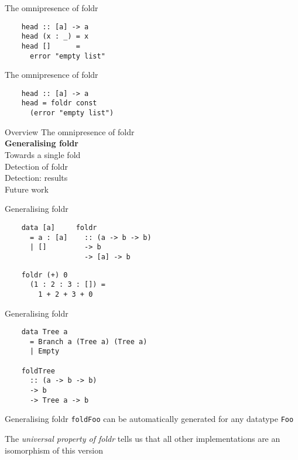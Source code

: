 \documentclass[20pt]{beamer}
\newcommand{\vspaced}{
    \vspace{5mm}
}
\begin{document}
\begin{frame}[fragile]{The omnipresence of foldr}
    \begin{lstlisting}
    head :: [a] -> a
    head (x : _) = x
    head []      =
      error "empty list"
    \end{lstlisting}
\end{frame}

\begin{frame}[fragile]{The omnipresence of foldr}
    \begin{lstlisting}
    head :: [a] -> a
    head = foldr const
      (error "empty list")
    \end{lstlisting}
\end{frame}


\begin{frame}{Overview}
    The omnipresence of foldr \\
    \textbf{Generalising foldr} \\
    Towards a single fold \\
    Detection of foldr \\
    Detection: results \\
    Future work \\
\end{frame}

\begin{frame}[fragile]{Generalising foldr}
    \begin{lstlisting}
    data [a]     foldr
      = a : [a]    :: (a -> b -> b)
      | []         -> b
                   -> [a] -> b
    \end{lstlisting}

    \begin{lstlisting}
    foldr (+) 0
      (1 : 2 : 3 : []) =
        1 + 2 + 3 + 0
    \end{lstlisting}
\end{frame}

\begin{frame}[fragile]{Generalising foldr}
    \begin{lstlisting}
    data Tree a
      = Branch a (Tree a) (Tree a)
      | Empty

    foldTree
      :: (a -> b -> b)
      -> b
      -> Tree a -> b
    \end{lstlisting}
\end{frame}

\begin{frame}{Generalising foldr}
    \texttt{foldFoo} can be automatically generated for any datatype
    \texttt{Foo} \\
    \vspaced
    The \emph{universal property of foldr} tells us that all other
    implementations are an isomorphism of this version
\end{frame}
\end{document}
